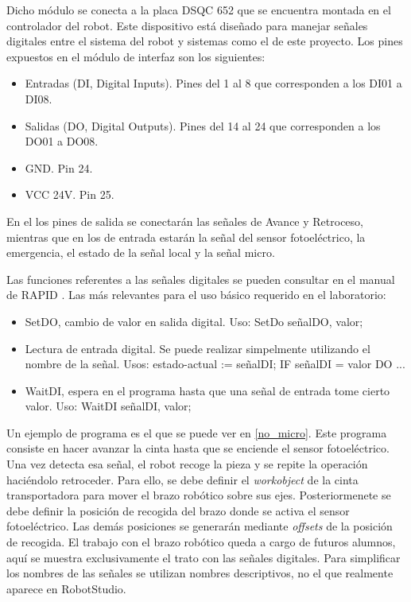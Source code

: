 Dicho módulo se conecta a la placa DSQC 652 que se encuentra montada en el controlador del robot.
Este dispositivo está diseñado para manejar señales digitales entre el sistema del robot y sistemas
como el de este proyecto. Los pines expuestos en el módulo de interfaz son los siguientes:
\begin{itemize}
    \item Entradas (DI, Digital Inputs). Pines del 1 al 8 que corresponden a los DI01 a DI08.
    \item Salidas (DO, Digital Outputs). Pines del 14 al 24 que corresponden a los DO01 a DO08.
    \item GND. Pin 24.
    \item VCC 24V. Pin 25.
\end{itemize}

En el los pines de salida se conectarán las señales de Avance y Retroceso, mientras que en los
de entrada estarán la señal del sensor fotoeléctrico, la emergencia, el estado de la señal local y
la señal micro.

Las funciones referentes a las señales digitales se pueden consultar en el manual de RAPID \cite{rapid}.
Las más relevantes para el uso básico requerido en el laboratorio:
\begin{itemize}
    \item SetDO, cambio de valor en salida digital. Uso: SetDo señalDO, valor;
    \item Lectura de entrada digital. Se puede realizar simpelmente utilizando el nombre de la señal. 
    Usos: estado-actual := señalDI; IF señalDI = valor DO ...
    \item WaitDI, espera en el programa hasta que una señal de entrada tome cierto valor.
    Uso: WaitDI señalDI, valor;
\end{itemize}

Un ejemplo de programa es el que se puede ver en \ref{no_micro}. Este programa consiste en hacer avanzar
la cinta hasta que se enciende el sensor fotoeléctrico.
Una vez detecta esa señal, el robot recoge la pieza y se repite la operación 
haciéndolo retroceder. Para ello, se debe definir el \textit{workobject} de la cinta transportadora para mover
el brazo robótico sobre sus ejes. Posteriormenete se debe definir la posición de recogida del brazo donde 
se activa el sensor fotoeléctrico. Las demás posiciones se generarán mediante \emph{offsets} de la posición de recogida.
El trabajo con el brazo robótico queda a cargo de futuros alumnos, aquí se muestra exclusivamente el trato 
con las señales digitales. Para simplificar los nombres de las señales se utilizan nombres descriptivos, no
el que realmente aparece en RobotStudio.

